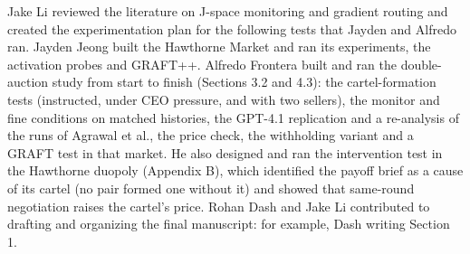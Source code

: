 \documentclass[11pt,letterpaper]{article}
\newcommand{\head}[1]{\par\vspace{9pt}{\noindent\fontsize{14}{17}\selectfont\bfseries\color[HTML]{434343}#1\par}\nopagebreak\vspace{4pt}\nopagebreak}
\newenvironment{instr}{\par\itshape\setlength{\parindent}{0pt}\raggedright}{\par}
\begin{document}
\head{Author Contributions}
\begin{instr}
Jake Li reviewed the literature on J-space monitoring and gradient routing and created the experimentation plan for the following tests that Jayden and Alfredo ran. Jayden Jeong built the Hawthorne Market and ran its experiments, the activation probes and GRAFT++. Alfredo Frontera built and ran the double-auction study from start to finish (Sections 3.2 and 4.3): the cartel-formation tests (instructed, under CEO pressure, and with two sellers), the monitor and fine conditions on matched histories, the GPT-4.1 replication and a re-analysis of the runs of Agrawal et al., the price check, the withholding variant and a GRAFT test in that market. He also designed and ran the intervention test in the Hawthorne duopoly (Appendix B), which identified the payoff brief as a cause of its cartel (no pair formed one without it) and showed that same-round negotiation raises the cartel's price. Rohan Dash and Jake Li contributed to drafting and organizing the final manuscript: for example, Dash writing Section 1.

\end{instr}
\end{document}
